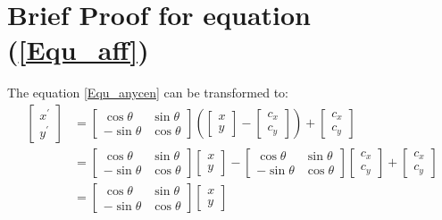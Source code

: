 \section{Brief Proof for equation (\ref{Equ_aff})}
\par\noindent
The equation \ref{Equ_anycen} can be transformed to:
\begin{equation*}
  \begin{split}
  \begin{bmatrix}
   x^{'} \\ y^{'}
   \end{bmatrix} &= \begin{bmatrix} \cos\theta & \sin\theta \\ -\sin\theta & \cos\theta \end{bmatrix} \left(\begin{bmatrix} x \\ y \end{bmatrix} - \begin{bmatrix} c_{x} \\ c_{y} \end{bmatrix}\right) + \begin{bmatrix} c_{x} \\ c_{y} \end{bmatrix} \\
                 &= \begin{bmatrix}
          \cos\theta & \sin\theta \\
          -\sin\theta & \cos\theta
        \end{bmatrix}
        \begin{bmatrix}
          x \\ y
         \end{bmatrix} - \begin{bmatrix}
            \cos\theta & \sin\theta \\
            -\sin\theta & \cos\theta
          \end{bmatrix}\begin{bmatrix}
            c_{x} \\ c_{y}
          \end{bmatrix} + \begin{bmatrix}
            c_{x} \\ c_{y}
          \end{bmatrix} \\
          &= \begin{bmatrix} \cos\theta & \sin\theta \\ -\sin\theta & \cos\theta \end{bmatrix} \begin{bmatrix} x \\ y \end{bmatrix}

\end{split}
\end{equation*}
